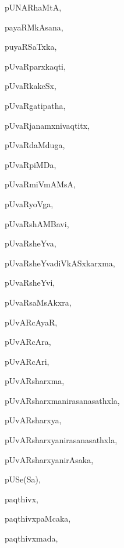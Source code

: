 \begin{multicols}{3}
{\noindent
{pUNARhaMtA}, \pageref{pUNARhaMtA}

\noindent
{payaRMkAsana}, \pageref{payaRMkAsana}

\noindent
{puyaRSaTxka}, \pageref{puyaRSaTxka}

\noindent
{pUvaRparxkaqti}, \pageref{pUvaRparxkaqti}

\noindent
{pUvaRkakeSx}, \pageref{pUvaRkakeSx}

\noindent
{pUvaRgatipatha}, \pageref{pUvaRgatipatha}

\noindent
{pUvaRjanamxnivaqtitx}, \pageref{pUvaRjanamxnivaqtitx}

\noindent
{pUvaRdaMduga}, \pageref{pUvaRdaMduga}

\noindent
{pUvaRpiMDa}, \pageref{pUvaRpiMDa}

\noindent
{pUvaRmiVmAMsA}, \pageref{pUvaRmiVmAMsA}

\noindent
{pUvaRyoVga}, \pageref{pUvaRyoVga}

\noindent
{pUvaRshAMBavi}, \pageref{pUvaRshAMBavi}

\noindent
{pUvaRsheYva}, \pageref{pUvaRsheYva}

\noindent
{pUvaRsheYvadiVkASxkarxma}, \pageref{pUvaRsheYvadiVkASxkarxma}

\noindent
{pUvaRsheYvi}, \pageref{pUvaRsheYvi}

\noindent
{pUvaRsaMsAkxra}, \pageref{pUvaRsaMsAkxra}

\noindent
{pUvARcAyaR}, \pageref{pUvARcAyaR}

\noindent
{pUvARcAra}, \pageref{pUvARcAra}

\noindent
{pUvARcAri}, \pageref{pUvARcAri}

\noindent
{pUvARsharxma}, \pageref{pUvARsharxma}

\noindent
{pUvARsharxmanirasanasathxla}, \pageref{pUvARsharxmanirasanasathxla}

\noindent
{pUvARsharxya}, \pageref{pUvARsharxya}

\noindent
{pUvARsharxyanirasanasathxla}, \pageref{pUvARsharxyanirasanasathxla}

\noindent
{pUvARsharxyanirAsaka}, \pageref{pUvARsharxyanirAsaka}

\noindent
{pUSe(Sa)}, \pageref{pUSeSa}

\noindent
{paqthivx}, \pageref{paqthivx}

\noindent
{paqthivxpaMcaka}, \pageref{paqthivxpaMcaka}

\noindent
{paqthivxmada}, \pageref{paqthivxmada}

}
\end{multicols}
